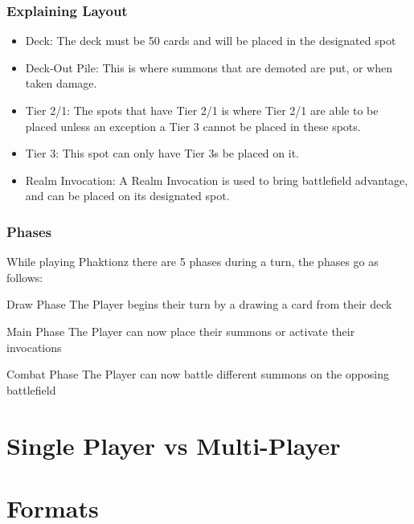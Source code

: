 \documentclass{beamer}
\begin{document}
\begin{frame}
    \frametitle{Explaining Layout}
\begin{itemize}
    \item Deck: The deck must be 50 cards and will be placed in the designated spot 
    \item Deck-Out Pile: This is where summons that are demoted are put, or when taken damage. 
    \item Tier 2/1: The spots that have Tier 2/1 is where Tier 2/1 are able to be placed unless an exception a Tier 3 cannot be placed in these spots. 
    \item Tier 3: This spot can only have Tier 3s be placed on it. 
    \item Realm Invocation: A Realm Invocation is used to bring battlefield advantage, and can be placed on its designated spot. 
\end{itemize}
    

\end{frame}



\begin{frame}
    \frametitle{Phases}
    \textrm{While playing Phaktionz there are 5 phases during a turn, the phases go as follows:} 
    \begin{alertblock}{Draw Phase}
        \textrm{The Player begins their turn by a drawing a card from their deck}
    \end{alertblock}
    \begin{alertblock}{Main Phase}
       \textrm{The Player can now place their summons or activate their invocations}
    \end{alertblock}
    \begin{alertblock}{Combat Phase}
        \textrm{The Player can now battle different summons on the opposing battlefield}
    \end{alertblock}

\end{frame}




\section{Single Player vs Multi-Player}





\section{Formats}
\end{document}
